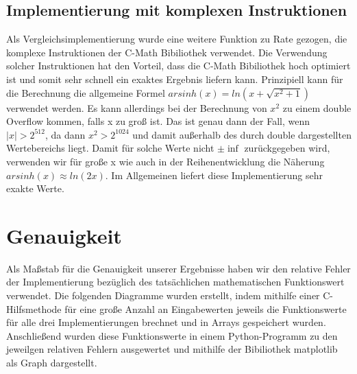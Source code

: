 \documentclass[course=erap] {aspdoc}
\begin{document}
 
 
     
 
     \subsection{Implementierung mit komplexen Instruktionen}
     
     Als Vergleichsimplementierung wurde eine weitere Funktion zu Rate gezogen, die komplexe Instruktionen der C-Math Bibiliothek verwendet. Die Verwendung solcher Instruktionen hat den Vorteil, dass die C-Math Bibiliothek hoch optimiert ist und somit sehr schnell ein exaktes Ergebnis liefern kann. Prinzipiell kann für die Berechnung die allgemeine Formel $ arsinh(x) = ln \left(x + \sqrt{x^2 + 1} \right)$ verwendet werden. Es kann allerdings bei der Berechnung von $x^2$ zu einem double Overflow kommen, falls x zu groß ist. Das ist genau dann der Fall, wenn $|x| > 2^{512}$, da dann $x^2 > 2^{1024}$ und damit außerhalb des durch double dargestellten Wertebereichs liegt. Damit für solche Werte nicht $\pm \inf$ zurückgegeben wird, verwenden wir für große x wie auch in der Reihenentwicklung die Näherung $arsinh(x)\approx ln(2x)$. Im Allgemeinen liefert diese Implementierung sehr exakte Werte. 
 
     \section{Genauigkeit}
     Als Maßstab für die Genauigkeit unserer Ergebnisse haben wir den relative Fehler der Implementierung bezüglich des tatsächlichen mathematischen Funktionswert verwendet. Die folgenden Diagramme wurden erstellt, indem mithilfe einer C-Hilfsmethode für eine große Anzahl an Eingabewerten jeweils die Funktionswerte für alle drei Implementierungen brechnet und in Arrays gespeichert wurden. Anschließend wurden diese Funktionswerte in einem Python-Programm zu den jeweilgen relativen Fehlern ausgewertet und mithilfe der Bibiliothek matplotlib als Graph dargestellt.
 
\end{document}
